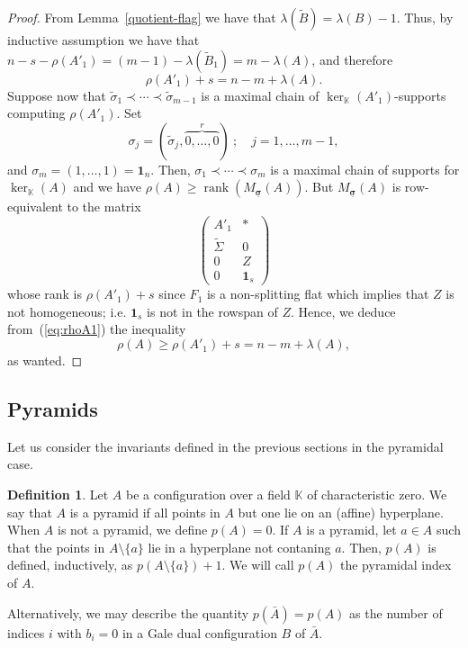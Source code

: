 \documentclass[11pt]{amsart}
\theoremstyle{plain}
\theoremstyle{definition}
\newtheorem{definition}[theorem]{Definition}
\theoremstyle{remark}
\newcommand{\rank}{\operatorname{rank}}
\renewcommand{\k}{{\mathbb K}}
\newcommand{\csig}{\ensuremath{\underline{\mathbf \sigma}}}
\numberwithin{equation}{section}
\begin{document}
\begin{proof}
From Lemma~\ref{quotient-flag} we have that $\lambda(\tilde B)  = \lambda(B) -1$.  Thus, by inductive assumption we have that
$n - s- \rho(A'_1) = (m - 1) - \lambda(\tilde B_1) = m - \lambda(A)$,
and therefore 
\begin{equation}\label{eq:rhoA1}
\rho(A'_1) + s = n - m + \lambda(A).\end{equation}
Suppose now that $\tilde\sigma_1 \prec \cdots \prec \tilde\sigma_{m-1}$ is a maximal chain of $\ker_\k(A'_1)$-supports 
computing $\rho(A'_1)$.  Set
$$\sigma_j = (\tilde\sigma_j,\overbrace{0,\dots,0}^r)\ ; \quad j=1,\dots,m-1,$$
and $\sigma_{m} = (1, \dots, 1) = {\mathbf 1}_n$.
Then, $\sigma_1 \prec \cdots \prec \sigma_{m}$ is a maximal chain of supports for $\ker_\k(A)$ and we have
$\rho(A) \geq \rank(M_{\csig}(A))$.
But $M_{\csig}(A)$ is row-equivalent to the matrix
$$\left(\begin{array}{cc}A'_1& \ast \\\tilde\Sigma & 0 \\0 & Z \\0 & {\mathbf 1}_s\end{array}\right)$$
whose rank is $\rho(A'_1) + s$ since $F_1$ is a non-splitting flat which implies that $Z$ is not homogeneous; i.e. 
${\mathbf 1}_s$ is not in the rowspan of $Z$.  Hence, we deduce
from~(\ref{eq:rhoA1}) the inequality
$$
\rho(A) \geq \rho(A'_1) + s = n - m + \lambda(A),
$$
as wanted. 
\end{proof}

\bigskip

\subsection{\bf {Pyramids}} \label{sec:pyramid}


 Let us consider the invariants defined in the previous sections in the pyramidal case.
 

  \begin{definition}\label{def:pyr}
 Let $A$ be a  configuration over a field $\k$ of characteristic zero.  We say that 
 $A$ is a pyramid if all points in $A$ but one lie on an (affine) hyperplane.
When $A$ is not a pyramid,  we define $p(A)=0$. If $A$ is a pyramid, let $a \in A$
such that the points in $A \setminus\{a\}$ lie in a hyperplane not contaning
$a$. Then, $p(A)$ is defined, inductively, as $p(A \setminus\{a\})+1$.  We will call $p(A)$ the pyramidal index of $A$.
\end{definition}

Alternatively, we may describe the quantity $p(\bar{A})= p(A)$ as the 
 number of indices $i$ with $b_i=0$ in a Gale dual  configuration $B$ of $\bar{A}$.
\end{document}
